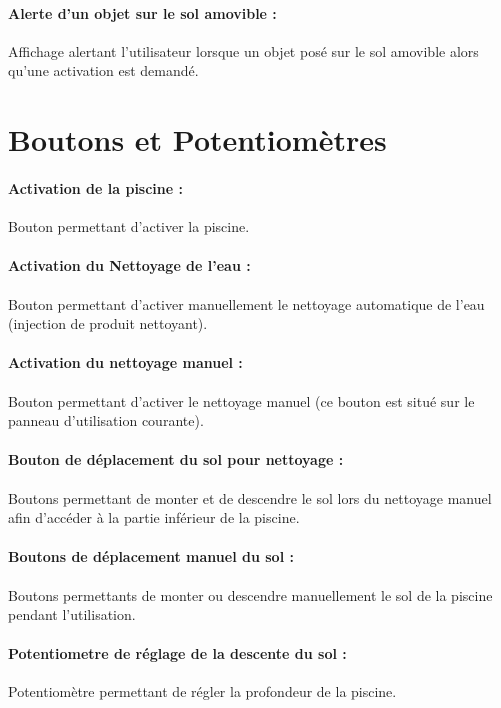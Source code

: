 \documentclass[a4paper,11pt]{article}
\begin{document}
    \paragraph{Alerte d'un objet sur le sol amovible :}
        Affichage alertant l'utilisateur lorsque un objet posé sur le sol amovible alors qu'une activation est demandé.
        

\section{Boutons et Potentiomètres}

    \paragraph{Activation de la piscine :}
	    Bouton permettant d'activer la piscine.

    \paragraph{Activation du Nettoyage de l'eau :}
	    Bouton permettant d'activer manuellement le nettoyage automatique de l'eau (injection de produit nettoyant).

    \paragraph{Activation du nettoyage manuel :}
        Bouton permettant d'activer le nettoyage manuel (ce bouton est situé sur le panneau d'utilisation courante).

    \paragraph{Bouton de déplacement du sol pour nettoyage :}
        Boutons permettant de monter et de descendre le sol lors du nettoyage manuel afin d'accéder à la partie inférieur de la piscine.

    \paragraph{Boutons de déplacement manuel du sol :}
        Boutons permettants de monter ou descendre manuellement le sol de la piscine pendant l'utilisation.

    \paragraph{Potentiometre de réglage de la descente du sol :}
	    Potentiomètre permettant de régler la profondeur de la piscine.
\end{document}
